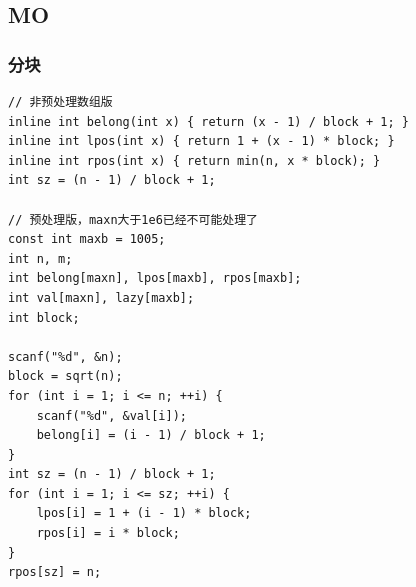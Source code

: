 \documentclass[twoside]{article}
\begin{document}
\subsection{MO}
\subsubsection{分块}
\begin{lstlisting}
// 非预处理数组版
inline int belong(int x) { return (x - 1) / block + 1; }
inline int lpos(int x) { return 1 + (x - 1) * block; }
inline int rpos(int x) { return min(n, x * block); }
int sz = (n - 1) / block + 1;

// 预处理版，maxn大于1e6已经不可能处理了
const int maxb = 1005;
int n, m;
int belong[maxn], lpos[maxb], rpos[maxb];
int val[maxn], lazy[maxb];
int block;

scanf("%d", &n);
block = sqrt(n);
for (int i = 1; i <= n; ++i) {
    scanf("%d", &val[i]);
    belong[i] = (i - 1) / block + 1;
}
int sz = (n - 1) / block + 1;
for (int i = 1; i <= sz; ++i) {
    lpos[i] = 1 + (i - 1) * block;
    rpos[i] = i * block;
}
rpos[sz] = n;\end{lstlisting}
\end{document}
